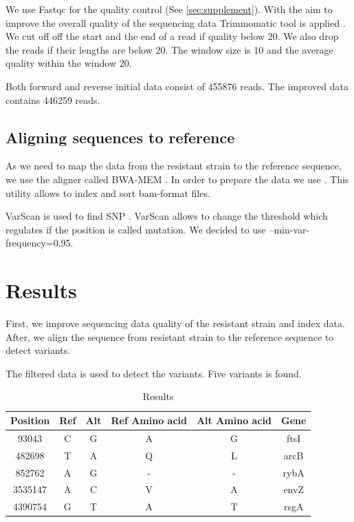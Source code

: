 \documentclass{article}
\begin{document}
We use Fastqc for the quality control \cite{fqc} (See \ref{sec:supplement}).  With the aim to improve the overall quality of the sequencing data Trimmomatic tool is applied \cite{trim}. We cut off  off the start and the end of a read if quality below 20. We also drop the reads if their lengths are below 20. The window size is 10 and  the average quality  within the window 20. 

 Both forward and reverse initial data consist of 455876 reads. The improved data contains 446259 reads.  \\

\subsection{Aligning sequences to reference}
As we need to map the data from the resistant strain to the reference sequence, we use the aligner called BWA-MEM \cite{bwa}. In order to prepare the data we use \cite{sam}. This utility allows to index and sort bam-format files.

VarScan is used to find SNP \cite{var}. VarScan allows to change the threshold which regulates if  the position is called mutation. We decided to use --min-var-frequency=0.95. 

\section{Results}
First, we improve sequencing data quality of the resistant strain and index data. After, we align the sequence from resistant strain to the reference sequence to detect variants. 
 

The filtered data is used to detect the variants. Five variants is found. 

\begin{table}[h!]
\centering
\begin{tabular}{||c c c c c c  ||} 
 \hline
Position  & Ref & Alt  & Ref Amino acid & Alt  Amino acid & Gene   \\ [0.5ex] 
 \hline\hline
93043 & C & G & A &  G& ftsI \\ 
482698 & T & A  & Q & L  & arcB  \\
852762 & A & G & - & - & rybA \\
3535147 & A & C & V& A&  envZ \\ 
4390754 & G & T & A& T&  rsgA \\ [1ex] 
 \hline
\end{tabular}
\caption{Results }
\label{table:2}
\end{table}
\end{document}
